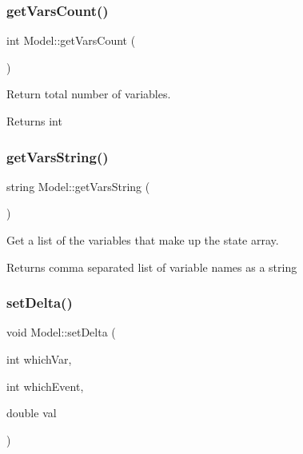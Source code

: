 \subsubsection{\texorpdfstring{get\+Vars\+Count()}{getVarsCount()}}
{\footnotesize\ttfamily int Model\+::get\+Vars\+Count (\begin{DoxyParamCaption}{ }\end{DoxyParamCaption})}



Return total number of variables. 

\begin{DoxyReturn}{Returns}
int 
\end{DoxyReturn}
\mbox{\label{class_model_a9ee802e2090b51ae403d39f6ec0138d8}} 
\subsubsection{\texorpdfstring{get\+Vars\+String()}{getVarsString()}}
{\footnotesize\ttfamily string Model\+::get\+Vars\+String (\begin{DoxyParamCaption}{ }\end{DoxyParamCaption})}



Get a list of the variables that make up the state array. 

\begin{DoxyReturn}{Returns}
comma separated list of variable names as a string 
\end{DoxyReturn}
\mbox{\label{class_model_a007d1420536d6e53aa253b6106875148}} 
\subsubsection{\texorpdfstring{set\+Delta()}{setDelta()}}
{\footnotesize\ttfamily void Model\+::set\+Delta (\begin{DoxyParamCaption}\item[{int}]{which\+Var,  }\item[{int}]{which\+Event,  }\item[{double}]{val }\end{DoxyParamCaption})}



